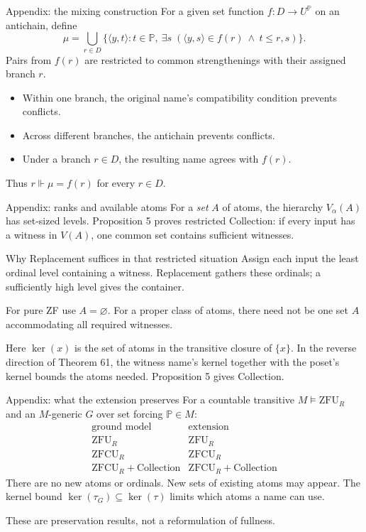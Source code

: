 \documentclass[aspectratio=169,11pt]{beamer}
\begin{document}
\begin{frame}[t]{Appendix: the mixing construction}
For a given set function $f:D\to U^{\mathbb P}$ on an antichain, define
\[
\mu=\bigcup_{r\in D}
\{\langle y,t\rangle:t\in\mathbb P,\ \exists s\;(\langle y,s\rangle\in f(r)\ \land\ t\leq r,s)\}.
\]
Pairs from $f(r)$ are restricted to common strengthenings with their assigned branch $r$.
\begin{itemize}
\item Within one branch, the original name's compatibility condition prevents conflicts.
\item Across different branches, the antichain prevents conflicts.
\item Under a branch $r\in D$, the resulting name agrees with $f(r)$.
\end{itemize}
Thus $r\Vdash\mu=f(r)$ for every $r\in D$.
\end{frame}

\begin{frame}[t]{Appendix: ranks and available atoms}
For a \emph{set} $A$ of atoms, the hierarchy $V_\alpha(A)$ has set-sized levels.
Proposition 5 proves restricted Collection: if every input has a witness in $V(A)$, one common set contains sufficient witnesses.
\begin{block}{Why Replacement suffices in that restricted situation}
Assign each input the least ordinal level containing a witness.
Replacement gathers these ordinals; a sufficiently high level gives the container.
\end{block}
For pure ZF use $A=\varnothing$. For a proper class of atoms, there need not be one set $A$ accommodating all required witnesses.
\medskip\par
Here $\operatorname{ker}(x)$ is the set of atoms in the transitive closure of $\{x\}$. In the reverse direction of Theorem 61, the witness name's kernel together with the poset's kernel bounds the atoms needed. Proposition 5 gives Collection.
\end{frame}

\begin{frame}[t]{Appendix: what the extension preserves}
For a countable transitive $M\models\mathrm{ZFU}_{R}$ and an $M$-generic $G$ over set forcing $\mathbb P\in M$:
\[
\begin{array}{c|c}
\text{ground model}&\text{extension}\\\hline
\mathrm{ZFU}_{R}&\mathrm{ZFU}_{R}\\[3pt]
\mathrm{ZFCU}_{R}&\mathrm{ZFCU}_{R}\\[3pt]
\mathrm{ZFCU}_{R}+\text{Collection}&\mathrm{ZFCU}_{R}+\text{Collection}
\end{array}
\]
There are no new atoms or ordinals. New sets of existing atoms may appear.
The kernel bound $\operatorname{ker}(\tau_G)\subseteq\operatorname{ker}(\tau)$ limits which atoms a name can use.
\medskip\par
These are preservation results, not a reformulation of fullness.
\end{frame}
\end{document}
